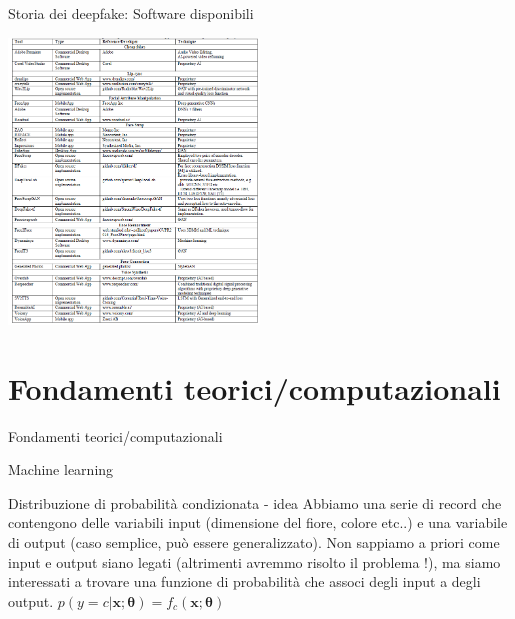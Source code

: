 \documentclass[11pt]{beamer}
\begin{document}
\begin{frame}{Storia dei deepfake: Software disponibili \cite{masood2023deepfakes}}

\begin{center}
\includegraphics[width=0.5\textwidth]{Pic/deepfake_tools.png}
\end{center}

\end{frame}


\section{Fondamenti teorici/computazionali}

\begin{frame}
\begin{center}
\Huge
Fondamenti teorici/computazionali
\end{center}
\end{frame}


\begin{frame}{Machine learning \cite{pml1Book,pml2Book,classification_datacamp}}

\begin{alertblock}{Distribuzione di probabilità condizionata - idea }
Abbiamo una serie di record che contengono delle variabili  input (dimensione del fiore, colore etc..) e una variabile di output (caso semplice, può essere generalizzato). Non sappiamo a priori come input e output siano legati (altrimenti avremmo risolto il problema !), ma siamo interessati a trovare una funzione di probabilità che associ degli input a degli output. $p(y=c|\textbf{x};\bm{\theta})=f_{c}(\textbf{x};\bm{\theta})$
\end{alertblock}


\end{frame}
\end{document}
